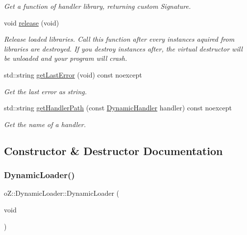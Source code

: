 \begin{DoxyCompactItemize}
\begin{DoxyCompactList}\small\item\em Get a function of handler library, returning custom Signature. \end{DoxyCompactList}\item 
void \mbox{\hyperlink{classo_z_1_1_dynamic_loader_a405559cdad1b8eba0bd3bee22fa764f9}{release}} (void)
\begin{DoxyCompactList}\small\item\em Release loaded libraries. Call this function after every instances aquired from libraries are destroyed. If you destroy instances after, the virtual destructor will be unloaded and your program will crash. \end{DoxyCompactList}\item 
std\+::string \mbox{\hyperlink{classo_z_1_1_dynamic_loader_ae822f62c912bfdc978188d22e45798ff}{get\+Last\+Error}} (void) const noexcept
\begin{DoxyCompactList}\small\item\em Get the last error as string. \end{DoxyCompactList}\item 
std\+::string \mbox{\hyperlink{classo_z_1_1_dynamic_loader_a732fb1a8c82a4caa1a5e3a227b9d32ab}{get\+Handler\+Path}} (const \mbox{\hyperlink{namespaceo_z_acbfabf71824b5fc6a3beb64e397afc19}{Dynamic\+Handler}} handler) const noexcept
\begin{DoxyCompactList}\small\item\em Get the name of a handler. \end{DoxyCompactList}\end{DoxyCompactItemize}


\subsection{Constructor \& Destructor Documentation}
\mbox{\label{classo_z_1_1_dynamic_loader_ab046e300c6645cc5fdb1e3c1d0c4690b}} 
\subsubsection{\texorpdfstring{DynamicLoader()}{DynamicLoader()}}
{\footnotesize\ttfamily o\+Z\+::\+Dynamic\+Loader\+::\+Dynamic\+Loader (\begin{DoxyParamCaption}\item[{void}]{ }\end{DoxyParamCaption})\hspace{0.3cm}{\ttfamily [default]}}



